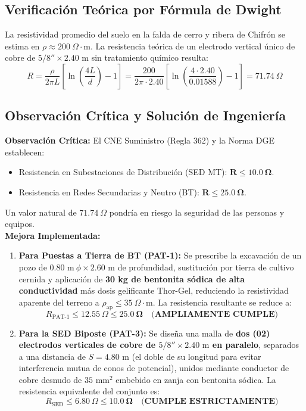 \documentclass[12pt,a4paper]{report}
\begin{document}
\subsection{Verificación Teórica por Fórmula de Dwight}
La resistividad promedio del suelo en la falda de cerro y ribera de Chifrón se estima en $\rho \approx 200\ \Omega\cdot\text{m}$. La resistencia teórica de un electrodo vertical único de cobre de $5/8'' \times 2.40\text{ m}$ sin tratamiento químico resulta:
\begin{equation}
    R = \frac{\rho}{2\pi L} \left[ \ln\left( \frac{4L}{d} \right) - 1 \right] = \frac{200}{2\pi \cdot 2.40} \left[ \ln\left( \frac{4 \cdot 2.40}{0.01588} \right) - 1 \right] = 71.74\ \Omega
\end{equation}

\subsection{Observación Crítica y Solución de Ingeniería}
\textbf{Observación Crítica:} El CNE Suministro (Regla 362) y la Norma DGE establecen:
\begin{itemize}
    \item Resistencia en Subestaciones de Distribución (SED MT): $\mathbf{R \le 10.0\ \Omega}$.
    \item Resistencia en Redes Secundarias y Neutro (BT): $\mathbf{R \le 25.0\ \Omega}$.
\end{itemize}
Un valor natural de $71.74\ \Omega$ pondría en riesgo la seguridad de las personas y equipos.\\
\textbf{Mejora Implementada:}
\begin{enumerate}
    \item \textbf{Para Puestas a Tierra de BT (PAT-1):} Se prescribe la excavación de un pozo de $0.80\text{ m}\ \phi \times 2.60\text{ m}$ de profundidad, sustitución por tierra de cultivo cernida y aplicación de \textbf{30 kg de bentonita sódica de alta conductividad} más dosis gelificante Thor-Gel, reduciendo la resistividad aparente del terreno a $\rho_{\text{ap}} \le 35\ \Omega\cdot\text{m}$. La resistencia resultante se reduce a:
    \begin{equation}
        R_{\text{PAT-1}} \le 12.55\ \Omega \le \mathbf{25.0\ \Omega} \quad \textbf{(AMPLIAMENTE CUMPLE)}
    \end{equation}
    \item \textbf{Para la SED Biposte (PAT-3):} Se diseña una malla de \textbf{dos (02) electrodos verticales de cobre de $5/8'' \times 2.40\text{ m}$ en paralelo}, separados a una distancia de $S = 4.80\text{ m}$ (el doble de su longitud para evitar interferencia mutua de conos de potencial), unidos mediante conductor de cobre desnudo de $35\text{ mm}^2$ embebido en zanja con bentonita sódica. La resistencia equivalente del conjunto es:
    \begin{equation}
        R_{\text{SED}} \le 6.80\ \Omega \le \mathbf{10.0\ \Omega} \quad \textbf{(CUMPLE ESTRICTAMENTE)}
    \end{equation}
\end{enumerate}
\end{document}
